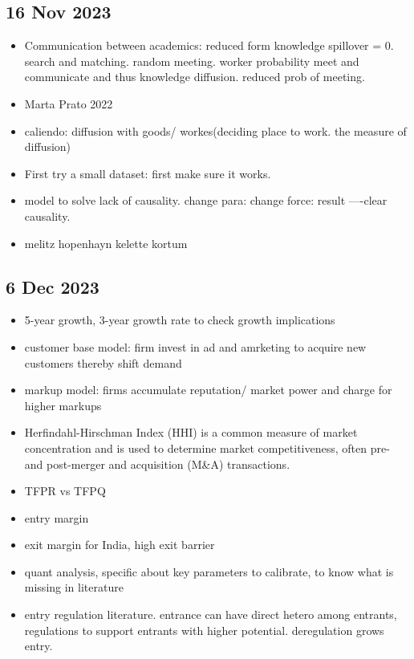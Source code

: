 	\subsection{16 Nov 2023}
		\begin{itemize}
			\item Communication between academics: reduced form knowledge spillover = 0. search and matching. random meeting. worker probability meet and communicate and thus knowledge diffusion. reduced prob of meeting.
			\item Marta Prato 2022
			\item caliendo: diffusion with goods/ workes(deciding place to work. the measure of diffusion)
			\item First try a small dataset: first make sure it works.
			\item model to solve lack of causality. change para: change force: result ----clear causality.
			\item melitz hopenhayn kelette kortum
		\end{itemize}
	\subsection{6 Dec 2023}
		\begin{itemize}
			\item 5-year growth, 3-year growth rate to check growth implications
			\item customer base model: firm invest in ad and amrketing to acquire new customers thereby shift demand
			\item markup model: firms accumulate reputation/ market power and charge for higher markups
			\item Herfindahl-Hirschman Index (HHI) is a common measure of market concentration and is used to determine market competitiveness, often pre- and post-merger and acquisition (M\&A) transactions.
			\item TFPR vs TFPQ
			\item entry margin
			\item exit margin for India, high exit barrier
			\item quant analysis, specific about key parameters to calibrate, to know what is missing in literature
			\item entry regulation literature. entrance can have direct hetero among entrants, regulations to support entrants with higher potential. deregulation grows entry.
		\end{itemize}

